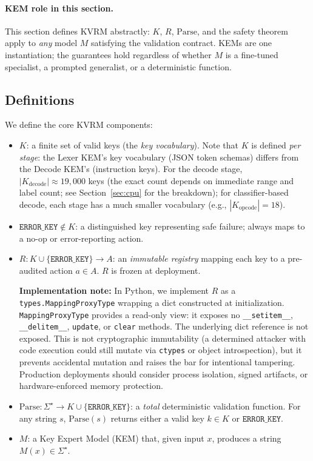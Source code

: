 \documentclass[11pt]{article}
\begin{document}
\paragraph{KEM role in this section.}
This section defines KVRM abstractly: $K$, $R$, $\mathrm{Parse}$, and the safety theorem apply to \emph{any} model $M$ satisfying the validation contract. KEMs are one instantiation; the guarantees hold regardless of whether $M$ is a fine-tuned specialist, a prompted generalist, or a deterministic function.

\subsection{Definitions}
We define the core KVRM components:
\begin{itemize}[leftmargin=*]
  \item $K$: a finite set of valid keys (the \emph{key vocabulary}). Note that $K$ is defined \emph{per stage}: the Lexer KEM's key vocabulary (JSON token schemas) differs from the Decode KEM's (instruction keys). For the decode stage, $|K_{\mathrm{decode}}| \approx 19{,}000$ keys (the exact count depends on immediate range and label count; see Section~\ref{sec:cpu} for the breakdown); for classifier-based decode, each stage has a much smaller vocabulary (e.g., $|K_{\mathrm{opcode}}| = 18$).
  \item $\texttt{ERROR\_KEY} \notin K$: a distinguished key representing safe failure; always maps to a no-op or error-reporting action.
  \item $R : K \cup \{\texttt{ERROR\_KEY}\} \rightarrow A$: an \emph{immutable registry} mapping each key to a pre-audited action $a \in A$. $R$ is frozen at deployment.

  \textbf{Implementation note:} In Python, we implement $R$ as a \texttt{types.MappingProxyType} wrapping a dict constructed at initialization. \texttt{MappingProxyType} provides a read-only view: it exposes no \texttt{\_\_setitem\_\_}, \texttt{\_\_delitem\_\_}, \texttt{update}, or \texttt{clear} methods. The underlying dict reference is not exposed. This is not cryptographic immutability (a determined attacker with code execution could still mutate via \texttt{ctypes} or object introspection), but it prevents accidental mutation and raises the bar for intentional tampering. Production deployments should consider process isolation, signed artifacts, or hardware-enforced memory protection.
  \item $\mathrm{Parse} : \Sigma^\star \rightarrow K \cup \{\texttt{ERROR\_KEY}\}$: a \emph{total} deterministic validation function. For any string $s$, $\mathrm{Parse}(s)$ returns either a valid key $k \in K$ or $\texttt{ERROR\_KEY}$.
  \item $M$: a Key Expert Model (KEM) that, given input $x$, produces a string $M(x) \in \Sigma^\star$.
\end{itemize}
\end{document}
